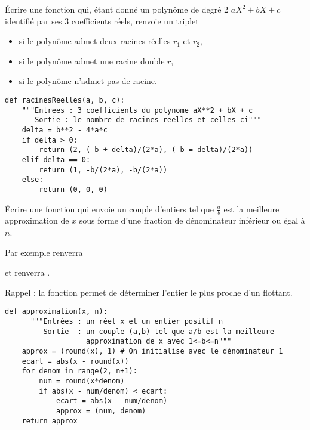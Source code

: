 \begin{Exercise}[title={Second degré}]
Écrire une fonction  qui, étant donné un polynôme de degré 2 $aX^2+bX+c$ identifié par ses 3 coefficients réels, renvoie un triplet 
\begin{itemize}
    \item {} si le polynôme admet deux racines réelles $r_1$ et $r_2$,
    \item {} si le polynôme admet une racine double $r$,
    \item {} si le polynôme n'admet pas de racine.
\end{itemize}
\end{Exercise}
\begin{Answer}
\begin{lstlisting}
def racinesReelles(a, b, c):
    """Entrees : 3 coefficients du polynome aX**2 + bX + c
       Sortie : le nombre de racines reelles et celles-ci"""
    delta = b**2 - 4*a*c
    if delta > 0:
        return (2, (-b + delta)/(2*a), (-b = delta)/(2*a))
    elif delta == 0:
        return (1, -b/(2*a), -b/(2*a))
    else:
        return (0, 0, 0)
\end{lstlisting}
\end{Answer}
\begin{Exercise}[title= Approximation]
Écrire une fonction  qui envoie un couple d'entiers  tel que $\frac ab$ est la meilleure approximation de $x$ sous forme d'une fraction de dénominateur inférieur ou égal à $n$. 

Par exemple  renverra  

et  renverra .

Rappel : la fonction  permet de déterminer l'entier le plus proche d'un flottant.

\end{Exercise}
\begin{Answer}
\begin{lstlisting}
def approximation(x, n):
	  """Entrées : un réel x et un entier positif n
	     Sortie  : un couple (a,b) tel que a/b est la meilleure 
	               approximation de x avec 1<=b<=n"""
    approx = (round(x), 1) # On initialise avec le dénominateur 1
    ecart = abs(x - round(x))
    for denom in range(2, n+1):
        num = round(x*denom)
        if abs(x - num/denom) < ecart:
            ecart = abs(x - num/denom)
            approx = (num, denom)
    return approx
\end{lstlisting}
\end{Answer}
